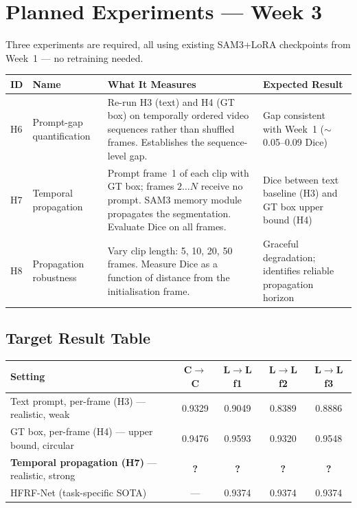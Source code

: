 \documentclass[11pt, a4paper]{article}
\begin{document}
\section{Planned Experiments --- Week 3}

Three experiments are required, all using existing SAM3+LoRA checkpoints
from Week~1 --- no retraining needed.

\begin{center}
\begin{tabular}{C{0.8cm} p{3.5cm} p{5cm} p{3.5cm}}
\toprule
\textbf{ID} & \textbf{Name} & \textbf{What It Measures} & \textbf{Expected Result} \\
\midrule
H6 & Prompt-gap quantification &
    Re-run H3 (text) and H4 (GT box) on temporally ordered video sequences
    rather than shuffled frames. Establishes the sequence-level gap. &
    Gap consistent with Week~1 ($\sim$0.05--0.09 Dice) \\
H7 & Temporal propagation &
    Prompt frame~1 of each clip with GT box; frames $2\ldots N$ receive
    no prompt. SAM3 memory module propagates the segmentation.
    Evaluate Dice on all frames. &
    Dice between text baseline (H3) and GT box upper bound (H4) \\
H8 & Propagation robustness &
    Vary clip length: 5, 10, 20, 50 frames. Measure Dice as a function
    of distance from the initialisation frame. &
    Graceful degradation; identifies reliable propagation horizon \\
\bottomrule
\end{tabular}
\end{center}

\subsection{Target Result Table}

\begin{center}
\begin{tabular}{lcccc}
\toprule
\textbf{Setting} & \textbf{C$\to$C} & \textbf{L$\to$L f1} &
    \textbf{L$\to$L f2} & \textbf{L$\to$L f3} \\
\midrule
Text prompt, per-frame (H3) --- realistic, weak        & 0.9329 & 0.9049 & 0.8389 & 0.8886 \\
GT box, per-frame (H4) --- upper bound, circular       & 0.9476 & 0.9593 & 0.9320 & 0.9548 \\
\textbf{Temporal propagation (H7)} --- realistic, strong & \textbf{?} & \textbf{?} & \textbf{?} & \textbf{?} \\
\midrule
HFRF-Net (task-specific SOTA)                          & ---    & 0.9374 & 0.9374 & 0.9374 \\
\bottomrule
\end{tabular}
\end{center}
\end{document}
